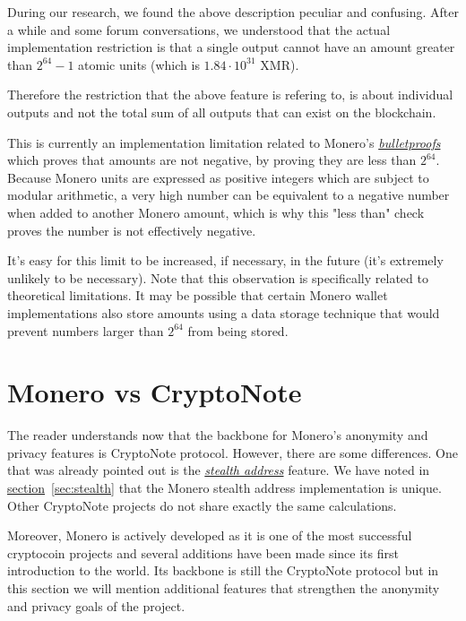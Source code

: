 During our research, we found the above description peculiar and confusing. After a while and some forum conversations, we understood that the actual implementation restriction is that a single output cannot have an amount greater than $2^{64} − 1$ atomic units (which is $1.84 \cdot 10^{31}$ XMR).

Therefore the restriction that the above feature is refering to, is about individual outputs and not the total sum of all outputs that can exist on the blockchain.
\vspace{0.2cm}

This is currently an implementation limitation related to Monero's \hyperref[sec:bulletproofs]{\emph{bulletproofs}}~\cite{getmonero} which proves that amounts are not negative, by proving they are less than $2^{64}$. Because Monero units are expressed as positive integers which are subject to modular arithmetic, a very high number can be equivalent to a negative number when added to another Monero amount, which is why this "less than" check proves the number is not effectively negative.

It's easy for this limit to be increased, if necessary, in the future (it's extremely unlikely to be necessary). Note that this observation is specifically related to theoretical limitations. It may be possible that certain Monero wallet implementations also store amounts using a data storage technique that would prevent numbers larger than $2^{64}$ from being stored.
\clearpage
\pagebreak

\section{Monero vs CryptoNote}
The reader understands now that the backbone for Monero's anonymity and privacy features is CryptoNote protocol. However, there are some differences. One that was already pointed out is the \hyperref[sec:stealth]{\emph{stealth address}} feature. We have noted in \hyperref[sec:stealth]{section}~\ref{sec:stealth} that the Monero stealth address implementation is unique. Other CryptoNote projects do not share exactly the same calculations.

Moreover, Monero is actively developed as it is one of the most successful cryptocoin projects and several additions have been made since its first introduction to the world. Its backbone is still the CryptoNote protocol but in this section we will mention additional features that strengthen the anonymity and privacy goals of the project.

